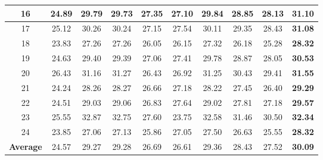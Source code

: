 \documentclass[10pt,onecolumn,letterpaper]{article}
\begin{document}
\begin{table}
\begin{center}
\begin{tabular}{|c||c|c|c|c|c|c|c|c|c|}
\\
\hline
16 & 24.89 & 29.79 & 29.73 & 27.35 & 27.10 & 29.84 & 28.85 & 28.13 & \textbf{31.10}
\\
\hline
17 & 25.12 & 30.26 & 30.24 & 27.15 & 27.54 & 30.11 & 29.35 & 28.43 & \textbf{31.08}
\\
\hline
18 & 23.83 & 27.26 & 27.26 & 26.05 & 26.15 & 27.32 & 26.18 & 25.28 & \textbf{28.32}
\\
\hline
19 & 24.63 & 29.40 & 29.39 & 27.06 & 27.41 & 29.78 & 28.87 & 28.05 & \textbf{30.53}
\\
\hline
20 & 26.43 & 31.16 & 31.27 & 26.43 & 26.92 & 31.25 & 30.43 & 29.41 & \textbf{31.55}
\\
\hline
21 & 24.24 & 28.26 & 28.27 & 26.66 & 27.18 & 28.22 & 27.45 & 26.40 & \textbf{29.29}
\\
\hline
22 & 24.51 & 29.03 & 29.06 & 26.83 & 27.64 & 29.02 & 27.81 & 27.18 & \textbf{29.57}
\\
\hline
23 & 25.55 & 32.87 & 32.75 & 27.60 & 23.75 & 32.58 & 31.46 & 30.50 & \textbf{32.34}
\\
\hline
24 & 23.85 & 27.06 & 27.13 & 25.86 & 27.05 & 27.50 & 26.63 & 25.55 & \textbf{28.32}
\\
\hline
\textbf{Average} & 24.57 & 29.27 & 29.28 & 26.69 & 26.61 & 29.36 & 28.43 & 27.52 & \textbf{30.09}
\\
\hline
\end{tabular}
\end{center}
\end{table}
\end{document}
